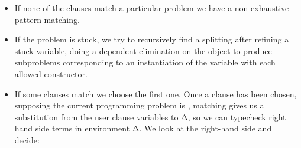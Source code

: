 \begin{itemize}
\item If none of the clauses match a particular problem
  we have a non-exhaustive pattern-matching. 

\item If the problem is stuck, we
  try to recursively find a splitting after refining a stuck variable,
  doing a dependent elimination on the object to produce subproblems
  corresponding to an instantiation of the variable with each allowed
  constructor.

\item If some clauses match we choose the first one. Once a clause has
  been chosen, supposing the
  current programming problem is , matching gives us a
  substitution from the user clause variables to Δ, so we can typecheck
  right hand side terms in environment Δ. We look at the right-hand side
  and decide:


\end{itemize}
